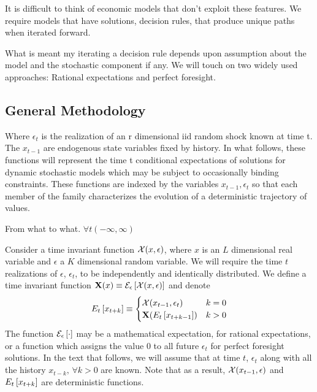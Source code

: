 \documentclass[12pt]{article}
\begin{document}
It is difficult to think of economic models  that don't exploit these features.
We require models that have solutions, decision rules, that produce unique paths when iterated forward.  

What is meant my iterating a decision rule depends upon assumption about the
model and the stochastic component if any.
We will  touch on two widely used approaches: Rational expectations and 
perfect foresight. 

\subsection{General Methodology}
\label{sec:general-methodology}



Where $\epsilon_t$ is the realization of an r dimensional iid random shock  known at time t. The $x_{t-1}$ are endogenous state variables fixed by history.  
In what follows, these functions will represent the time t conditional expectations of solutions for dynamic stochastic models which may be subject to occasionally binding constraints.  These functions are indexed by the variables $x_{t-1}, \epsilon_t$ so that each member of the family characterizes the evolution of a deterministic trajectory of values.

From what to what.  $\forall t (-\infty,\infty)$ 

Consider a time invariant function $\mathcal{X}(x,\epsilon)$, where $x$ is an $L$ dimensional real variable and $\epsilon$ a $K$ dimensional random variable. 
We will require
the time $t$ realizations of $\epsilon$, $\epsilon_t$, to be independently and identically distributed.
We define a time invariant function $\mathbf{X}(x)\equiv \mathcal{E}_{\epsilon} \left [\mathcal{X}(x,\epsilon) \right ]$ and denote
\begin{gather*}
E_{t} \left [x_{t+k} \right ]\equiv\begin{cases}
\mathcal{X}{(x_{t-1},\epsilon_t)} &k=0\\
\mathbf{X}{(E_{t} \left [x_{t+k-1} \right ])} &k>0
\end{cases}
\end{gather*}
The function $\mathcal{E}_{\epsilon} \left [\cdot \right ]$ may be a mathematical expectation, for rational expectations, or a function which assigns the value $0$ to all future $\epsilon_t$ for perfect foresight solutions.
In the text that follows, we will assume that at time $t$, $\epsilon_t$ along with all the history $x_{t-k},\, \forall k>0$ are known.
Note that as a result, 
$\mathcal{X}{(x_{t-1},\epsilon)}$ and 
$E_{t} \left [x_{t+k} \right ]$ are deterministic functions.  
\end{document}
